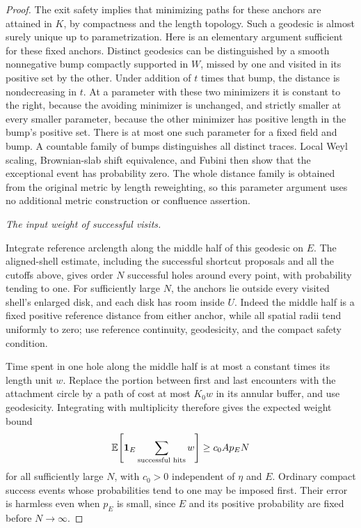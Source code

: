 \begin{proof}
The exit safety implies that minimizing paths for these anchors are
attained in $K$, by compactness and the length topology. Such a geodesic
is almost surely unique up to parametrization. Here is an elementary
argument sufficient for these fixed anchors. Distinct geodesics can be
distinguished by a smooth nonnegative bump compactly supported in $W$,
missed by one and visited in its positive set by the other. Under addition
of $t$ times that bump, the distance is nondecreasing in $t$. At a
parameter with these two minimizers it is constant to the right, because
the avoiding minimizer is unchanged, and strictly smaller at every smaller
parameter, because the other minimizer has positive length in the bump's
positive set. There is at most one such parameter for a fixed field and
bump. A countable family of bumps distinguishes all distinct traces.
Local Weyl scaling, Brownian-slab shift equivalence, and Fubini then show
that the exceptional event has probability zero. The whole distance
family is obtained from the original metric by length reweighting, so
this parameter argument uses no additional metric construction or
confluence assertion.

\smallskip\noindent\emph{The input weight of successful visits.}\par
Integrate reference arclength along the middle half of this geodesic on
$E$. The aligned-shell estimate, including the successful shortcut
proposals and all the cutoffs above, gives order $N$ successful holes
around every point, with probability tending to one. For sufficiently
large $N$, the anchors lie outside every visited shell's enlarged disk,
and each disk has room inside $U$. Indeed the middle half is a fixed
positive reference distance from either anchor, while all spatial radii
tend uniformly to zero; use reference continuity, geodesicity, and the
compact safety condition.

Time spent in one hole along the middle half is at most a constant times
its length unit $w$. Replace the portion between first and last encounters
with the attachment circle by a path of cost at most $K_0w$ in its annular
buffer, and use geodesicity. Integrating with multiplicity therefore gives
the expected weight bound
\begin{equation}\label{metric:input-hit-weight}
 \mathbb E\!\left[\mathbf 1_E\sum_{\text{successful hits}}w\right]
 \ge c_0 A p_E N
\end{equation}
for all sufficiently large $N$, with $c_0>0$ independent of $\eta$ and
$E$. Ordinary compact success events whose probabilities tend to one may
be imposed first. Their error is harmless even when $p_E$ is small,
since $E$ and its positive probability are fixed before $N\to\infty$.


\end{proof}
